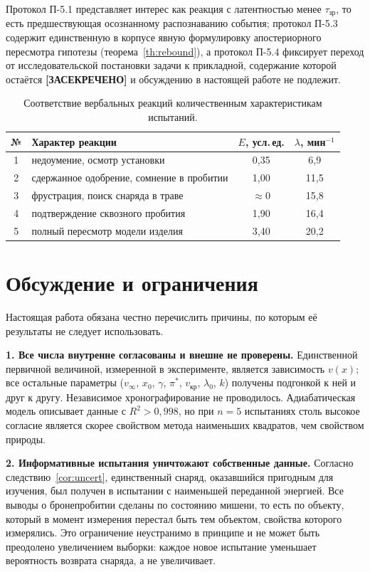 \documentclass[11pt,a4paper]{article}
\newcommand{\SEC}{\textbf{[ЗАСЕКРЕЧЕНО]}}
\begin{document}
\vspace{2mm}
Протокол П-5.1 представляет интерес как реакция с латентностью менее $\tau_{\text{зр}}$, то есть предшествующая осознанному распознаванию события; протокол П-5.3 содержит единственную в корпусе явную формулировку апостериорного пересмотра гипотезы (теорема~\ref{th:rebound}), а протокол П-5.4 фиксирует переход от исследовательской постановки задачи к прикладной, содержание которой остаётся \SEC{} и обсуждению в настоящей работе не подлежит.

\begin{table}[H]
\centering
\small
\caption{Соответствие вербальных реакций количественным характеристикам испытаний.}
\begin{tabular}{@{}clcc@{}}
\toprule
№ & Характер реакции & $E$, усл.\,ед. & $\lambda$, мин$^{-1}$ \\
\midrule
1 & недоумение, осмотр установки              & 0,35 & 6,9 \\
2 & сдержанное одобрение, сомнение в пробитии & 1,00 & 11,5 \\
3 & фрустрация, поиск снаряда в траве         & $\approx0$ & 15,8 \\
4 & подтверждение сквозного пробития          & 1,90 & 16,4 \\
5 & полный пересмотр модели изделия           & 3,40 & 20,2 \\
\bottomrule
\end{tabular}
\end{table}

\section{Обсуждение и ограничения}

Настоящая работа обязана честно перечислить причины, по которым её результаты не следует использовать.

\textbf{1. Все числа внутренне согласованы и внешне не проверены.} Единственной первичной величиной, измеренной в эксперименте, является зависимость $v(x)$; все остальные параметры ($v_\infty$, $x_0$, $\gamma$, $\pi^\ast$, $v_{\text{кр}}$, $\lambda_0$, $k$) получены подгонкой к ней и друг к другу. Независимое хронографирование не проводилось. Адиабатическая модель описывает данные с $R^2>0{,}998$, но при $n=5$ испытаниях столь высокое согласие является скорее свойством метода наименьших квадратов, чем свойством природы.

\textbf{2. Информативные испытания уничтожают собственные данные.} Согласно следствию~\ref{cor:uncert}, единственный снаряд, оказавшийся пригодным для изучения, был получен в испытании с наименьшей переданной энергией. Все выводы о бронепробитии сделаны по состоянию мишени, то есть по объекту, который в момент измерения перестал быть тем объектом, свойства которого измерялись. Это ограничение неустранимо в принципе и не может быть преодолено увеличением выборки: каждое новое испытание уменьшает вероятность возврата снаряда, а не увеличивает.
\end{document}

